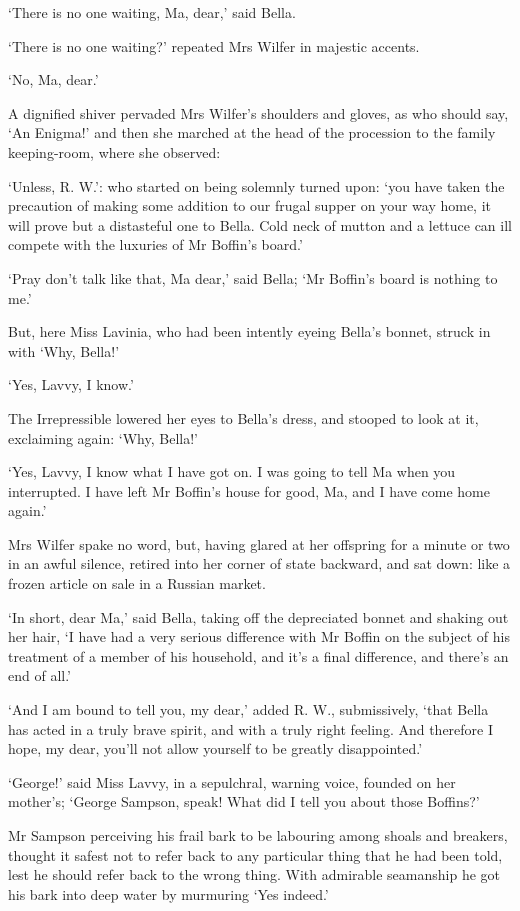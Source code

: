 ‘There is no one waiting, Ma, dear,’ said Bella.

‘There is no one waiting?’ repeated Mrs Wilfer in majestic accents.

‘No, Ma, dear.’

A dignified shiver pervaded Mrs Wilfer’s shoulders and gloves, as
who should say, ‘An Enigma!’ and then she marched at the head of the
procession to the family keeping-room, where she observed:

‘Unless, R. W.’: who started on being solemnly turned upon: ‘you have
taken the precaution of making some addition to our frugal supper on
your way home, it will prove but a distasteful one to Bella. Cold neck
of mutton and a lettuce can ill compete with the luxuries of Mr Boffin’s
board.’

‘Pray don’t talk like that, Ma dear,’ said Bella; ‘Mr Boffin’s board is
nothing to me.’

But, here Miss Lavinia, who had been intently eyeing Bella’s bonnet,
struck in with ‘Why, Bella!’

‘Yes, Lavvy, I know.’

The Irrepressible lowered her eyes to Bella’s dress, and stooped to look
at it, exclaiming again: ‘Why, Bella!’

‘Yes, Lavvy, I know what I have got on. I was going to tell Ma when you
interrupted. I have left Mr Boffin’s house for good, Ma, and I have come
home again.’

Mrs Wilfer spake no word, but, having glared at her offspring for a
minute or two in an awful silence, retired into her corner of state
backward, and sat down: like a frozen article on sale in a Russian
market.

‘In short, dear Ma,’ said Bella, taking off the depreciated bonnet and
shaking out her hair, ‘I have had a very serious difference with Mr
Boffin on the subject of his treatment of a member of his household, and
it’s a final difference, and there’s an end of all.’

‘And I am bound to tell you, my dear,’ added R. W., submissively, ‘that
Bella has acted in a truly brave spirit, and with a truly right feeling.
And therefore I hope, my dear, you’ll not allow yourself to be greatly
disappointed.’

‘George!’ said Miss Lavvy, in a sepulchral, warning voice, founded on
her mother’s; ‘George Sampson, speak! What did I tell you about those
Boffins?’

Mr Sampson perceiving his frail bark to be labouring among shoals and
breakers, thought it safest not to refer back to any particular thing
that he had been told, lest he should refer back to the wrong thing.
With admirable seamanship he got his bark into deep water by murmuring
‘Yes indeed.’


